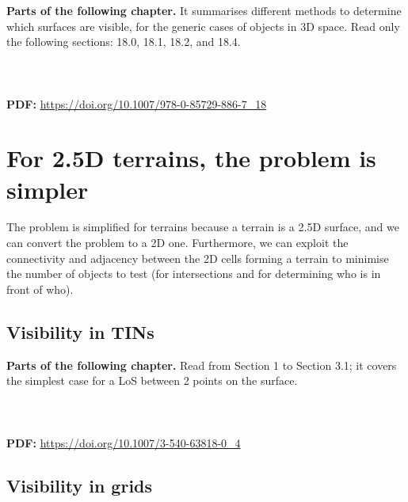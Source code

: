 \begin{kaobox-toread}[frametitle=\faExternalLink\ To read or to watch]
  \textbf{Parts of the following chapter.} It summarises different methods to determine which surfaces are visible, for the generic cases of objects in 3D space.
  Read only the following sections: 18.0, 18.1, 18.2, and 18.4.
  \\ \\
   \\ \\
  \textbf{PDF:} \url{https://doi.org/10.1007/978-0-85729-886-7_18}
\end{kaobox-toread}




%
\section[2.5D terrains are simple]{For 2.5D terrains, the problem is simpler}

The problem is simplified for terrains because a terrain is a 2.5D surface, and we can convert the problem to a 2D one.
Furthermore, we can exploit the connectivity and adjacency between the 2D cells forming a terrain to minimise the number of objects to test (for intersections and for determining who is in front of who).


%
\subsection{Visibility in TINs}

\begin{kaobox-toread}[frametitle=\faExternalLink\ To read or to watch]
\textbf{Parts of the following chapter.} 
Read from Section 1 to Section 3.1; it covers the simplest case for a LoS between 2 points on the surface.
\\ \\
 \\ \\
\textbf{PDF:} \url{https://doi.org/10.1007/3-540-63818-0_4}
\end{kaobox-toread}


%
\subsection{Visibility in grids}

